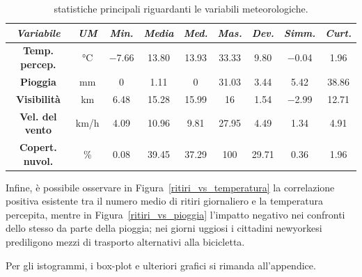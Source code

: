 \begin{table}[htp]
	\centering
	\renewcommand\arraystretch{1.5}
	\begin{tabular}{c|c|c|c|c|c|c|c|c}
		\hline
		\textit{Variabile} & \textit{UM} & \textit{Min.} & \textit{Media} & \textit{Med.} & \textit{Mas.} & \textit{Dev.} & \textit{Simm.}  & \textit{Curt.} \\
		\hline
		\textbf{Temp. percep.} & \unit{\degreeCelsius} & \num{-7.66} & \num{13.80} & \num{13.93} & \num{33.33} & \num{9.80} & \num{-0.04} & \num{1.96} \\
		\hline
		\textbf{Pioggia} & \unit{\milli\meter} & \num{0} & \num{1.11} & \num{0} & \num{31.03} & \num{3.44} & \num{5.42} & \num{38.86} \\
		\hline
		\textbf{Visibilità} & \si{\kilo\meter} & \num{6.48} & \num{15.28} & \num{15.99} & \num{16} & \num{1.54} & \num{-2.99} & \num{12.71} \\
		\hline
		\textbf{Vel. del vento} & \si{\kilo\meter/\hour} & \num{4.09} & \num{10.96} & \num{9.81} & \num{27.95} & \num{4.49} & \num{1.34} & \num{4.91} \\
		\hline
		\textbf{Copert. nuvol.} & \si{\percent} & \num{0.08} & \num{39.45} & \num{37.29} & \num{100} & \num{29.71} & \num{0.36} & \num{1.96} \\
		\hline
	\end{tabular}
	\caption[Statistiche principali riguardanti le variabili meteorologiche]{statistiche principali riguardanti le variabili meteorologiche.}
	\label{statistiche_variabili_meteo}
\end{table}

\par Infine, è possibile osservare in Figura~\ref{ritiri_vs_temperatura} la correlazione positiva esistente tra il numero medio di ritiri giornaliero e la temperatura percepita, mentre in Figura~\ref{ritiri_vs_pioggia} l'impatto negativo nei confronti dello stesso da parte della pioggia; nei giorni uggiosi i cittadini newyorkesi prediligono mezzi di trasporto alternativi alla bicicletta.
\par Per gli istogrammi, i box-plot e ulteriori grafici si rimanda all'appendice.

